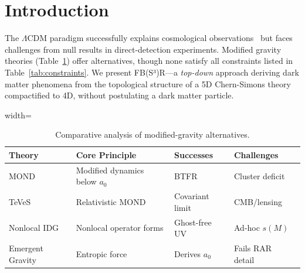 \maketitle

\section{Introduction}
The $\Lambda$CDM paradigm successfully explains cosmological observations~\cite{Planck2020} but faces challenges from null results in direct-detection experiments. Modified gravity theories (Table~\ref{tab:comparison}) offer alternatives, though none satisfy all constraints listed in Table~\ref{tab:constraints}. We present FB(S³)R---a \textit{top-down} approach deriving dark matter phenomena from the topological structure of a 5D Chern-Simons theory compactified to 4D, without postulating a dark matter particle.

\begin{table}[ht]
\caption{Comparative analysis of modified-gravity alternatives.}
\label{tab:comparison}
\begin{adjustbox}{width=\columnwidth}
\begin{tabular}{@{}llll@{}}
\toprule
Theory & Core Principle & Successes & Challenges \\
\midrule
MOND & Modified dynamics below $a_0$ & BTFR~\cite{Lelli2017} & Cluster deficit~\cite{Clowe2006} \\
TeVeS & Relativistic MOND & Covariant limit & CMB/lensing~\cite{Skordis2009} \\
Nonlocal IDG & Nonlocal operator forms & Ghost-free UV & Ad-hoc $s(M)$ \\
Emergent Gravity & Entropic force & Derives $a_0$ & Fails RAR detail~\cite{Lelli2017b} \\
\bottomrule
\end{tabular}
\end{adjustbox}
\end{table}

